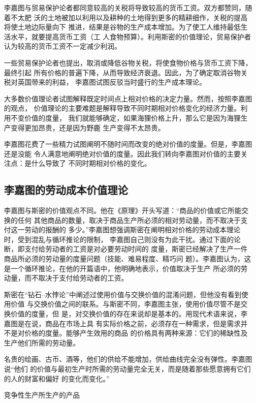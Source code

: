 李嘉图与贸易保护论者都同意较高的关税将导致较高的货币工资。双方都赞同，随着不太肥
沃的土地被加以利用以及耕种的土地得到更多的精耕细作，关税的提高将使土地边际量向下
推进，结果是谷物的生产成本增加。为了使工人维持最低生活水平，就要提高货币工资（工
人食物预算）。利用斯密的价值理论，贸易保护者认为较高的货币工资不一定减少利润。

一些贸易保护论者也提出，取消或降低谷物关税，将使食物价格与货币工资下降，最终引起
所有价格的普遍下降，从而导致经济衰退。因此，为了确定取消谷物关税对英国带来的利益，
李嘉图试图反驳当时盛行的生产成本理论。

大多数价值理论者试图解释既定时间点上相对价格的决定力量。然而，按照李嘉图的观点，
价值理论的主要难题是解释导致不同时期相对价格变化的经济力量。利用不变价值的度量，
我们就能够确定，如果海狸价格上升，那么它是因为海狸生产变得更加昂贵，还是因为野鹿
生产变得不太昂贵。

李嘉图花费了一些精力试图阐明不随时间而改变的绝对价值的度量。但是，李嘉图还是没能
令人满意地阐明绝对价值的度量。因此我们转向李嘉图对价值的主要关注点：是什么导致了
不同时期相对价格的变化。

\subsection{李嘉图的劳动成本价值理论}

李嘉图与斯密的价值观点不同。他在《原理》开头写道：“商品的价值或它所能交换的任何
其他商品的数量，取决于商品生产所必须的相对劳动量，而不取决于支付这一劳动的报酬的
多少。”李嘉图想强调斯密在阐明相对价格的劳动成本理论时，受到混乱与循环推论的限制，
李嘉图自己则没有为此干扰。通过下面的论断，即支付给劳动者的工资是对必要劳动时间的
度量，斯密已经解决了生产一件商品所必须的劳动量的度量问题（技能、难易程度、精巧问
题）。李嘉图认为，这是一个循环推论，在他的开篇语中，他明确地表示，价值取决于生产
所必须的劳动量，而不取决于支付给劳动者的工资。

斯密在“钻石--水悖论”中阐述过使用价值与交换价值的混淆问题，但他没有看到使用价值
与交换价值之间的联系。与斯密不同，李嘉图主张，使用价值尽管不是交换价值的度量，但
是，对交换价值的存在来说却是基本的。用现代术语来说，李嘉图是在说，商品在市场上具
有实际价格之前，必须存在一种需求，但是需求并不是对价格的度量。能够产生效用的商品
的价格具有两种来源：它们的稀缺性及生产他们所需的劳动量。

名贵的绘画、古币、酒等，他们的供给不能增加，供给曲线完全没有弹性。李嘉图说“他们
的价值与最初生产时所需的劳动量完全无关，而是随着那些愿意拥有它们的人的财富和偏好
的变化而变化。”

竞争性生产所生产的产品

